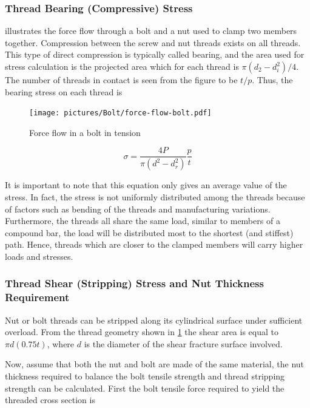 \documentclass[a4paper,openany,nobib]{tufte-book}
\begin{document}
{{\subsubsection{Thread Bearing (Compressive) Stress}
\label{thread-bearing-compressive-stress}
illustrates the force flow through a bolt and a nut used to clamp two
members together. Compression between the screw and nut threads exists
on all threads. This type of direct compression is typically called
bearing, and the area used for stress calculation is the projected area
which for each thread is \(\pi(d_2 - d_i^2) / 4\). The number of threads
in contact is seen from the figure to be \(t/p\). Thus, the bearing stress
on each thread is


\begin{figure}[htbp]
\centering
\texttt{[image: pictures/Bolt/force-flow-bolt.pdf]}
\caption{\label{fig: force flow in bolt}Force flow in a bolt in tension \cite{juvinall2006fundamentals}}
\end{figure}

$$\sigma  = \frac{4P}{\pi (d^2 - d_r^2)}\frac{p}{t}$$

It is important to note that this equation only gives an average value
of the stress. In fact, the stress is not uniformly distributed among
the threads because of factors such as bending of the threads and
manufacturing variations. Furthermore, the threads all share the same
load, similar to members of a compound bar, the load will be distributed
most to the shortest (and stiffest) path. Hence, threads which are
closer to the clamped members will carry higher loads and stresses.

\subsubsection{Thread Shear (Stripping) Stress and Nut Thickness Requirement}
\label{thread-shear-stripping-stress-and-nut-thickness-requirement}
Nut or bolt threads can be stripped along its cylindrical surface under
sufficient overload. From the thread geometry shown in
\ref{fig: force flow in bolt} the shear area
is equal to \(\pi d(0.75t)\), where \(d\) is the diameter of the shear
fracture surface involved.

Now, assume that both the nut and bolt are made of the same material,
the nut thickness required to balance the bolt tensile strength and
thread stripping strength can be calculated. First the bolt tensile
force required to yield the threaded cross section is

}}
\end{document}
